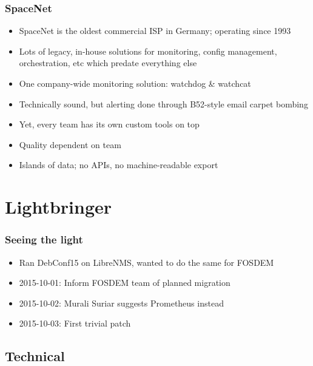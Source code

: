 \documentclass[t]{beamer}
\begin{document}
\begin{frame}
	\frametitle{SpaceNet}
	\begin{itemize}
		\item SpaceNet is the oldest commercial ISP in Germany; operating since 1993
		\item Lots of legacy, in-house solutions for monitoring, config management, orchestration, etc which predate everything else
		\item One company-wide monitoring solution: watchdog \& watchcat
		\item Technically sound, but alerting done through B52-style email carpet bombing
		\item Yet, every team has its own custom tools on top
		\item Quality dependent on team
		\item Islands of data; no APIs, no machine-readable export
	\end{itemize}
\end{frame}




% 

\section{Lightbringer}

\begin{frame}
	\frametitle{Seeing the light}
	\begin{itemize}
		\item Ran DebConf15 on LibreNMS, wanted to do the same for FOSDEM
		\item 2015-10-01: Inform FOSDEM team of planned migration
		\item 2015-10-02: Murali Suriar suggests Prometheus instead
		\item 2015-10-03: First trivial patch
	\end{itemize}
\end{frame}

\subsection{Technical}
\end{document}
